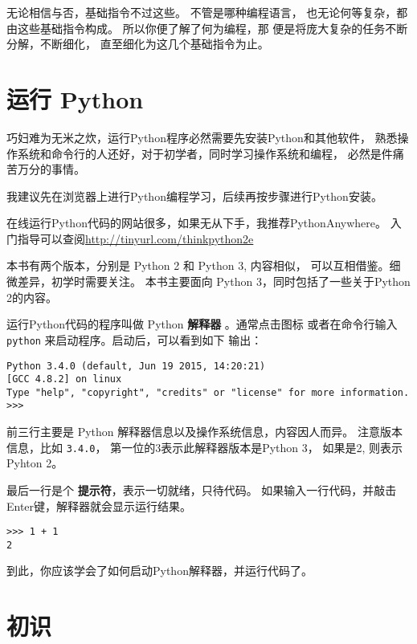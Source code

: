 \documentclass[10pt]{book}
\begin{document}
无论相信与否，基础指令不过这些。
不管是哪种编程语言，
也无论何等复杂，都由这些基础指令构成。
所以你便了解了何为编程，那
便是将庞大复杂的任务不断分解，不断细化，
直至细化为这几个基础指令为止。


\section{运行 Python}

巧妇难为无米之炊，运行Python程序必然需要先安装Python和其他软件，
熟悉操作系统和命令行的人还好，对于初学者，同时学习操作系统和编程，
必然是件痛苦万分的事情。

我建议先在浏览器上进行Python编程学习，后续再按步骤进行Python安装。

在线运行Python代码的网站很多，如果无从下手，我推荐PythonAnywhere。
入门指导可以查阅\url{http://tinyurl.com/thinkpython2e}

本书有两个版本，分别是 Python 2 和 Python 3, 内容相似，
可以互相借鉴。细微差异，初学时需要关注。
本书主要面向 Python 3，同时包括了一些关于Python 2的内容。

运行Python代码的程序叫做 Python {\bf 解释器} 。通常点击图标
或者在命令行输入{\tt python} 来启动程序。启动后，可以看到如下
输出：

\begin{verbatim}
Python 3.4.0 (default, Jun 19 2015, 14:20:21) 
[GCC 4.8.2] on linux
Type "help", "copyright", "credits" or "license" for more information.
>>> 
\end{verbatim}
%

前三行主要是 Python 解释器信息以及操作系统信息，内容因人而异。
注意版本信息，比如 {\tt 3.4.0}， 第一位的3表示此解释器版本是Python 3，
如果是2, 则表示Pyhton 2。

最后一行是个  {\bf 提示符}，表示一切就绪，只待代码。
如果输入一行代码，并敲击 Enter键，解释器就会显示运行结果。

\begin{verbatim}
>>> 1 + 1
2
\end{verbatim}
%

到此，你应该学会了如何启动Python解释器，并运行代码了。

\section{初识}
\label{hello}
\end{document}
